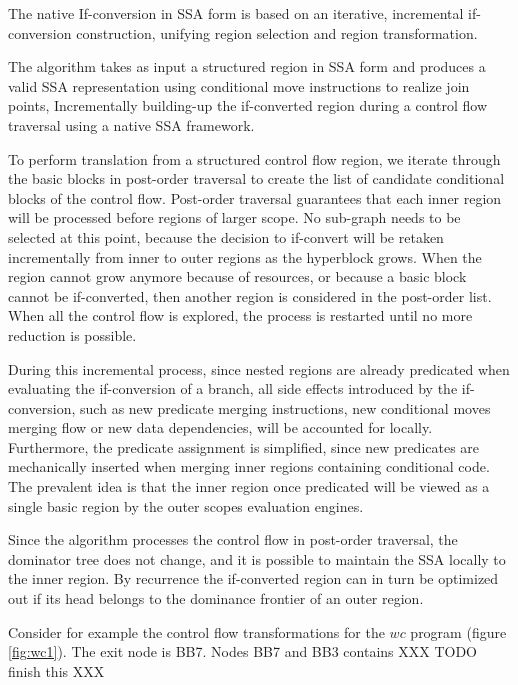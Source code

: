 The native If-conversion in SSA form is based on an iterative, incremental if-conversion construction, unifying region selection and region transformation. 

The algorithm takes as input a structured region in SSA form and produces a valid SSA representation using conditional move instructions to realize join points, Incrementally building-up the if-converted region during a control flow traversal using a native SSA framework.

To perform translation from a structured control flow region, we iterate through the basic blocks in post-order traversal to create the list of candidate conditional blocks of the control flow. Post-order traversal guarantees that each inner region will be processed before regions of larger scope. No sub-graph needs to be selected at this point, because the decision to if-convert will be retaken incrementally from inner to outer regions as the hyperblock grows. When the region cannot grow anymore because of resources, or because a basic block cannot be if-converted, then another region is considered in the post-order list. When all the control flow is explored, the process is restarted until no more reduction is possible.

During this incremental process, since nested regions are already predicated when evaluating the if-conversion of a branch, all side effects introduced by the if-conversion, such as new predicate merging instructions, new conditional moves merging flow or new data dependencies, will be accounted for locally. Furthermore, the predicate assignment is simplified, since new predicates are mechanically inserted when merging inner regions containing conditional code. The prevalent idea is that the inner region once predicated will be viewed as a single basic region by the outer scopes evaluation engines.

Since the algorithm processes the control flow in post-order traversal, the dominator tree does not change, and it is possible to maintain the SSA locally to the inner region. By recurrence the if-converted region can in turn be optimized out if its head belongs to the dominance frontier of an outer region.

Consider for example the control flow transformations for the $wc$ program (figure \ref{fig:wc1}). The exit node is BB7. Nodes BB7 and BB3 contains XXX TODO finish this XXX

